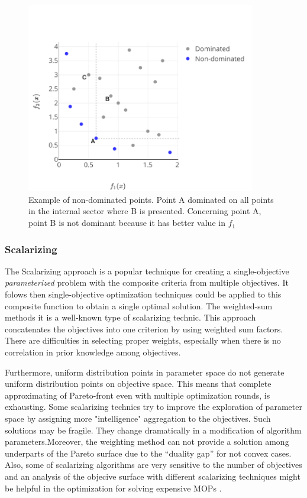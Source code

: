                 \begin{figure}
                    \centering
                    \includegraphics[width=10cm]{content/images/ndom}
                    \caption[Non-dominated points]{Example of non-dominated points. Point A dominated on all points in the internal sector where B is presented. Concerning point A, point B is not dominant because it has better value in $f_1$} 
                    \label{fig:dominated} 
                \end{figure}
        
            \subsubsection{Scalarizing}
                The Scalarizing approach is a popular technique for creating a single-objective \textit{parameterized} problem with the composite criteria from multiple objectives. It folows then single-objective optimization techniques could be applied to this composite function to obtain a single optimal solution. The weighted-sum methods it is a well-known type of scalarizing technic. This approach concatenates the objectives into one criterion by using weighted sum factors. There are difficulties in selecting proper weights, especially when there is no correlation in prior knowledge among objectives.  

                Furthermore, uniform distribution points in parameter space do not generate uniform distribution points on objective space. This means that complete approximating of Pareto-front even with multiple optimization rounds, is exhausting.
                Some scalarizing technics try to improve the exploration of parameter space by assigning more "intelligence" aggregation to the objectives. Such solutions may be fragile. They change dramatically in a modification of algorithm parameters.Moreover, the weighting method can not provide a solution among underparts of the Pareto surface due to the “duality gap” for not convex cases.                 Also, some of scalarizing algorithms are very sensitive to the number of objectives and an analysis of the objecive surface with different scalarizing techniques might be helpful in the optimization for solving expensive MOPs \cite{ChughScal2019}.

